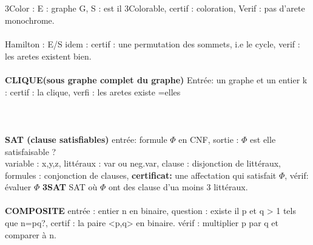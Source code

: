 \documentclass{article}
\begin{document}
\subparagraph{} 3Color : E : graphe G, S : est il 3Colorable, certif : coloration, Verif : pas d'arete monochrome.\\\\Hamilton : E/S idem : certif  : une permutation des sommets, i.e le cycle, verif : les aretes existent bien.\\\\\textbf{CLIQUE(sous graphe complet du graphe)} Entrée:  un graphe et un entier k :  certif : la clique, verfi : les aretes existe =elles\\
\\
\\
\\\textbf{SAT (clause satisfiables)} entrée: formule $\Phi$ en CNF, sortie  : $\Phi$ est elle satisfaisable ? \\ variable : x,y,z, littéraux : var ou neg.var, clause : disjonction de littéraux, formules : conjonction de clauses, \textbf{certificat:} une affectation qui satisfait $\Phi$, vérif: évaluer $\Phi$ \textbf{3SAT} SAT où $\Phi$ ont des clause d'ua moins 3 littéraux.\\\\
\textbf{COMPOSITE} entrée : entier n en binaire, question : existe il p et q > 1 tels que n=pq?, certif : la paire <p,q> en binaire. vérif : multiplier p par q et comparer à n.
\end{document}
